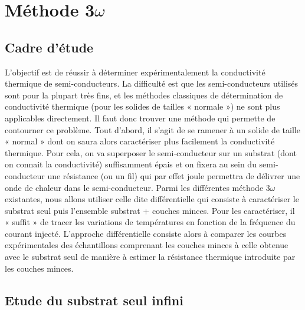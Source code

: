 \documentclass[10pt,a4paper]{report}
\begin{document}
\chapter{Méthode 3$\omega$}
\section{Cadre d'étude}
L’objectif est de réussir à déterminer expérimentalement la conductivité thermique de semi-conducteurs. La difficulté est que les semi-conducteurs utilisés sont pour la plupart très fins, et les méthodes classiques de détermination de conductivité thermique (pour les solides de tailles « normale ») ne sont plus applicables directement. Il faut donc trouver une méthode qui permette de contourner ce problème. Tout d’abord, il s’agit de se ramener à un solide de taille « normal » dont on saura alors caractériser plus facilement la conductivité thermique. Pour cela, on va superposer le semi-conducteur sur un substrat (dont on connait la conductivité) suffisamment épais et on fixera au sein du semi-conducteur une résistance (ou un fil) qui par effet joule permettra de délivrer une onde de chaleur dans le semi-conducteur. Parmi les différentes méthode 3$\omega$ existantes, nous allons utiliser celle dite différentielle qui consiste à caractériser le substrat seul puis l’ensemble substrat + couches minces. Pour les caractériser, il « suffit » de tracer les variations de températures en fonction de la fréquence du courant injecté. L'approche différentielle consiste alors à comparer les courbes expérimentales des échantillons comprenant les couches minces à celle obtenue avec le substrat seul de manière à estimer la résistance thermique introduite par les couches minces.
\section{Etude du substrat seul infini}
\end{document}
